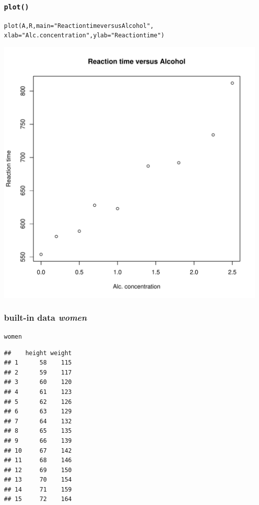 \documentclass[extsize,handout,10pt]{beamer}\usepackage[]{graphicx}\usepackage[]{color}
\makeatletter
\newcommand{\hlstr}[1]{\textcolor[rgb]{1,0.4,0.2}{#1}}%
\newcommand{\hlstd}[1]{\textcolor[rgb]{0.251,0.251,0.251}{#1}}%
\newcommand{\hlkwc}[1]{\textcolor[rgb]{0.188,0.941,0.314}{#1}}%
\newcommand{\hlkwd}[1]{\textcolor[rgb]{0.69,0.188,0.941}{#1}}%
\newenvironment{kframe}{%
 \def\at@end@of@kframe{}%
 \ifinner\ifhmode%
  \def\at@end@of@kframe{\end{minipage}}%
  \begin{minipage}{\columnwidth}%
 \fi\fi%
 \def\FrameCommand##1{\hskip\@totalleftmargin \hskip-\fboxsep
 \colorbox{shadecolor}{##1}\hskip-\fboxsep
     \hskip-\linewidth \hskip-\@totalleftmargin \hskip\columnwidth}%
 \MakeFramed {\advance\hsize-\width
   \@totalleftmargin\z@ \linewidth\hsize
   \@setminipage}}%
 {\par\unskip\endMakeFramed%
 \at@end@of@kframe}
\newenvironment{knitrout}{}{} %
\makeatother
\begin{document}
\begin{frame}[containsverbatim]
  \frametitle{\texttt{plot()}}
 
\begin{knitrout}\tiny
{}\color{fgcolor}\begin{kframe}
\begin{alltt}
\hlkwd{plot}\hlstd{(A,R,}\hlkwc{main}\hlstd{=}\hlstr{"Reaction time versus Alcohol"}\hlstd{,}
     \hlkwc{xlab}\hlstd{=}\hlstr{"Alc. concentration"}\hlstd{,}\hlkwc{ylab}\hlstd{=}\hlstr{"Reaction time"}\hlstd{)}
\end{alltt}
\end{kframe}

{\centering \includegraphics[width=.49\linewidth]{figures/unnamed-chunk-32-1} 

}



\end{knitrout}

\end{frame}

\begin{frame}[containsverbatim]
  \frametitle{built-in data \emph{women}}

\begin{knitrout}\tiny
{}\color{fgcolor}\begin{kframe}
\begin{alltt}
\hlstd{women}
\end{alltt}
\begin{verbatim}
##    height weight
## 1      58    115
## 2      59    117
## 3      60    120
## 4      61    123
## 5      62    126
## 6      63    129
## 7      64    132
## 8      65    135
## 9      66    139
## 10     67    142
## 11     68    146
## 12     69    150
## 13     70    154
## 14     71    159
## 15     72    164
\end{verbatim}
\end{kframe}
\end{knitrout}
  
\end{frame}
\end{document}
